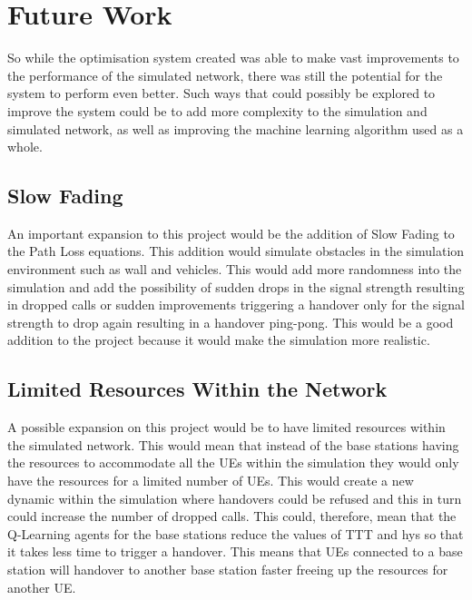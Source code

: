 \chapter{Future Work}\label{future work}
So while the optimisation system created was able to make vast improvements to the performance of the simulated network, there was still the potential for the system to perform even better. Such ways that could possibly be explored to improve the system could be to add more complexity to the simulation and simulated network, as well as improving the machine learning algorithm used as a whole.

\section{Slow Fading}
An important expansion to this project would be the addition of Slow Fading to the Path Loss equations. This addition would simulate obstacles in the simulation environment such as wall and vehicles. This would add more randomness into the simulation and add the possibility of sudden drops in the signal strength resulting in dropped calls or sudden improvements triggering a handover only for the signal strength to drop again resulting in a handover ping-pong. This would be a good addition to the project because it would make the simulation more realistic.

\section{Limited Resources Within the Network}
A possible expansion on this project would be to have limited resources within the simulated network. This would mean that instead of the base stations having the resources to accommodate all the UEs within the simulation they would only have the resources for a limited number of UEs. This would create a new dynamic within the simulation where handovers could be refused and this in turn could increase the number of dropped calls. This could, therefore, mean that the Q-Learning agents for the base stations reduce the values of TTT and hys so that it takes less time to trigger a handover. This means that UEs connected to a base station will handover to another base station faster freeing up the resources for another UE. 

